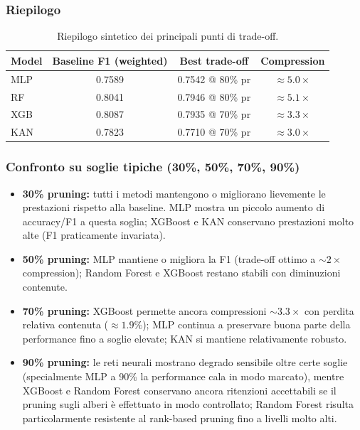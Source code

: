 \documentclass[a4paper,12pt]{report}
\begin{document}
	\subsubsection{Riepilogo}
	\begin{table}[H]
		\centering
		\begin{tabular}{lccc}
			\toprule
			\textbf{Model} & \textbf{Baseline F1 (weighted)} & \textbf{Best trade-off} & \textbf{Compression} \\
			\midrule
			MLP      & 0.7589 & 0.7542 @ 80\% pr & \(\approx 5.0\times\) \\
			RF       & 0.8041 & 0.7946 @ 80\% pr & \(\approx 5.1\times\) \\
			XGB      & 0.8087 & 0.7935 @ 70\% pr & \(\approx 3.3\times\) \\
			KAN      & 0.7823 & 0.7710 @ 70\% pr & \(\approx 3.0\times\) \\
			\bottomrule
		\end{tabular}
		\caption{Riepilogo sintetico dei principali punti di trade-off.}
	\end{table}
	
	\subsubsection{Confronto su soglie tipiche (30\%, 50\%, 70\%, 90\%)}
	\begin{itemize}
		\item \textbf{30\% pruning:} tutti i metodi mantengono o migliorano lievemente le prestazioni rispetto alla baseline. MLP mostra un piccolo aumento di accuracy/F1 a questa soglia; XGBoost e KAN conservano prestazioni molto alte (F1 praticamente invariata).
		\item \textbf{50\% pruning:} MLP mantiene o migliora la F1 (trade-off ottimo a \(\sim 2\times\) compression); Random Forest e XGBoost restano stabili con diminuzioni contenute.
		\item \textbf{70\% pruning:} XGBoost permette ancora compressioni \(\sim 3.3\times\) con perdita relativa contenuta (\(\approx 1.9\%\)); MLP continua a preservare buona parte della performance fino a soglie elevate; KAN si mantiene relativamente robusto.
		\item \textbf{90\% pruning:} le reti neurali mostrano degrado sensibile oltre certe soglie (specialmente MLP a 90\% la performance cala in modo marcato), mentre XGBoost e Random Forest conservano ancora ritenzioni accettabili se il pruning sugli alberi è effettuato in modo controllato; Random Forest risulta particolarmente resistente al rank-based pruning fino a livelli molto alti.
	\end{itemize}
	
\end{document}
